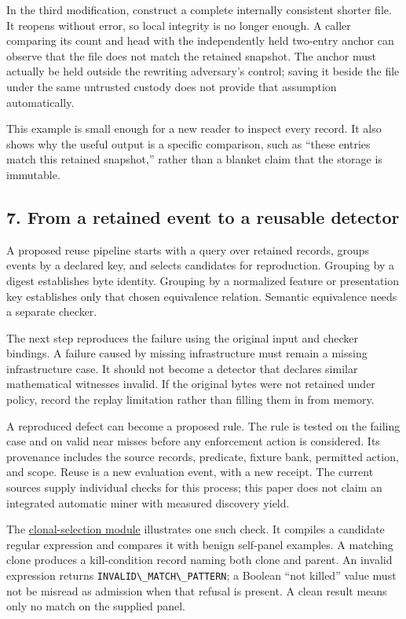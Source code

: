 \documentclass[
  11pt,
]{article}
\newcommand{\passthrough}[1]{#1}
\begin{document}
In the third modification, construct a complete internally consistent
shorter file. It reopens without error, so local integrity is no longer
enough. A caller comparing its count and head with the independently
held two-entry anchor can observe that the file does not match the
retained snapshot. The anchor must actually be held outside the
rewriting adversary's control; saving it beside the file under the same
untrusted custody does not provide that assumption automatically.

This example is small enough for a new reader to inspect every record.
It also shows why the useful output is a specific comparison, such as
``these entries match this retained snapshot,'' rather than a blanket
claim that the storage is immutable.

\subsection{7. From a retained event to a reusable
detector}\label{from-a-retained-event-to-a-reusable-detector}

A proposed reuse pipeline starts with a query over retained records,
groups events by a declared key, and selects candidates for
reproduction. Grouping by a digest establishes byte identity. Grouping
by a normalized feature or presentation key establishes only that chosen
equivalence relation. Semantic equivalence needs a separate checker.

The next step reproduces the failure using the original input and
checker bindings. A failure caused by missing infrastructure must remain
a missing infrastructure case. It should not become a detector that
declares similar mathematical witnesses invalid. If the original bytes
were not retained under policy, record the replay limitation rather than
filling them in from memory.

A reproduced defect can become a proposed rule. The rule is tested on
the failing case and on valid near misses before any enforcement action
is considered. Its provenance includes the source records, predicate,
fixture bank, permitted action, and scope. Reuse is a new evaluation
event, with a new receipt. The current sources supply individual checks
for this process; this paper does not claim an integrated automatic
miner with measured discovery yield.

The
\href{https://github.com/dbccpage/the_symbol_game/blob/52cb5457f6c485ba548cfd292f6012a941ed22cf/symbol_game/domain/immune/clonal_selection.py}{clonal-selection
module} illustrates one such check. It compiles a candidate regular
expression and compares it with benign self-panel examples. A matching
clone produces a kill-condition record naming both clone and parent. An
invalid expression returns
\passthrough{\lstinline!INVALID\_MATCH\_PATTERN!}; a Boolean ``not
killed'' value must not be misread as admission when that refusal is
present. A clean result means only no match on the supplied panel.
\end{document}
